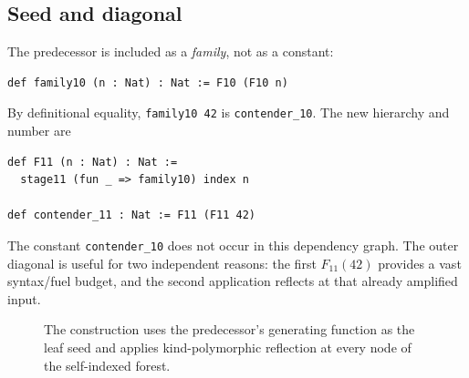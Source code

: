 \documentclass[11pt]{article}
\theoremstyle{definition}
\theoremstyle{remark}
\newcommand{\Celeven}{C_{11}}
\newcommand{\lean}[1]{\texttt{#1}}
\begin{document}
\subsection{Seed and diagonal}

The predecessor is included as a \emph{family}, not as a constant:
\begin{lstlisting}
def family10 (n : Nat) : Nat := F10 (F10 n)
\end{lstlisting}
By definitional equality, \lean{family10 42} is \lean{contender\_10}.  The new
hierarchy and number are
\begin{lstlisting}
def F11 (n : Nat) : Nat :=
  stage11 (fun _ => family10) index n

def contender_11 : Nat := F11 (F11 42)
\end{lstlisting}
The constant \lean{contender\_10} does not occur in this dependency graph.  The
outer diagonal is useful for two independent reasons: the first $F_{11}(42)$
provides a vast syntax/fuel budget, and the second application reflects at that
already amplified input.

\begin{figure}[ht]
\centering
{}
\caption{The construction uses the predecessor's generating function as the
leaf seed and applies kind-polymorphic reflection at every node of the
self-indexed forest.}
\label{fig:architecture}
\end{figure}
\end{document}
